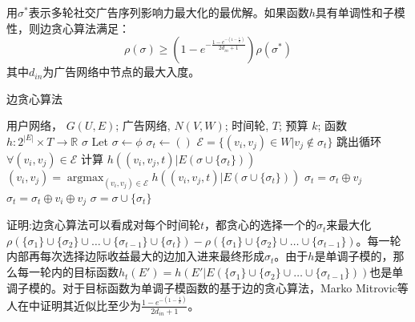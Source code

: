 \begin{theorem}
\label{thm:greedy}
用$\sigma^*$表示多轮社交广告序列影响力最大化的最优解。如果函数$h$具有单调性和子模性，则边贪心算法满足：
\begin{equation}
\rho(\sigma)\ge (1-e^{-\frac{1-e^{-(1-\frac{1}{k})}}{2d_{in}+1}})\rho(\sigma^*)
\end{equation}
\noindent 其中$d_{in}$为广告网络中节点的最大入度。
\end{theorem}
\begin{algorithm}[H]
    \renewcommand{\algorithmcfname}{算法}
    \caption{\label{alg:edge_greedy}边贪心算法} 
    \begin{algorithmic}[1]
    \REQUIRE 用户网络， \(G(U,E)\); 广告网络, \(N(V,W)\);
    时间轮, \(T\); 预算 \(k\);
    函数 \(h:2^{|E|} \times T \to \mathbb{R} \)
    \ENSURE \(\sigma\)
    \STATE Let \(\sigma \gets \phi \)
        \STATE \(\sigma_t \gets ( )\) \label{alg:greedy_line4}
            \STATE \(\mathcal{E} = \{(v_i,v_j) \in W | v_j \notin \sigma_t \}\)
                \STATE 跳出循环
            \ENDIF
            \STATE \(\forall (v_i,v_j) \in \mathcal{E}\) 计算 \(h((v_i,v_j,t)|E(\sigma \cup \{ \sigma_t\}))\) \label{alg:greedy_line3}
            \STATE \((v_i,v_j) = \mathop{\arg\max}_{(v_i,v_j) \in \mathcal{E}}h ((v_i,v_j,t)|E(\sigma \cup \{ \sigma_t\})) \)
                \STATE \(\sigma_t = \sigma_t \oplus v_j\) \label{alg:greedy_line1}
            \ELSE
                \STATE \(\sigma_t = \sigma_t \oplus v_i \oplus v_j\) \label{alg:greedy_line2}
            \ENDIF
        \ENDWHILE \label{alg:greedy_line5}
        \STATE \(\sigma = \sigma \cup \{\sigma_t\}\)
    \ENDFOR
    \end{algorithmic}
\end{algorithm}
\noindent 证明:边贪心算法可以看成对每个时间轮$t$，都贪心的选择一个的$\sigma_t$来最大化$\rho(\{\sigma_1\}\cup \{\sigma_2\}\cup\ldots \cup \{\sigma_{t-1}\}\cup\{\sigma_t\})-\rho(\{\sigma_1\}\cup\{\sigma_2\}\cup\ldots \cup \{\sigma_{t-1}\})$。每一轮内部再每次选择边际收益最大的边加入进来最终形成$\sigma_t$。由于$h$是单调子模的，那么每一轮内的目标函数$h_t(E')=h(E'|E(\{\sigma_1\}\cup\{\sigma_2\}\cup\ldots \cup \{\sigma_{t-1}\}))$也是单调子模的。对于目标函数为单调子模函数的基于边的贪心算法，Marko Mitrovic等人在\parencite{mitrovic2018submodularity}中证明其近似比至少为$\frac{1-e^{-(1-\frac{1}{k})}}{2d_{in}+1}$。

